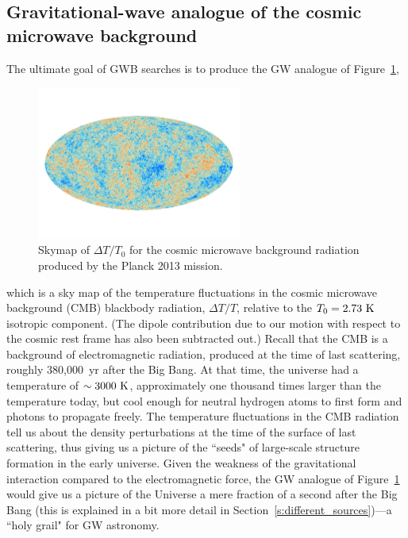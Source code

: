 \documentclass[11pt]{article}
\numberwithin{equation}{section}
\begin{document}
\subsection{Gravitational-wave analogue of the cosmic
microwave background}
\label{s:GW_CMB}

The ultimate goal of GWB searches is to produce 
the GW analogue of Figure~\ref{f:CMB},
%
\begin{figure}[htbp!]
\begin{center}
\includegraphics[width=0.6\textwidth]{Figures/CMB}
\caption{Skymap of $\Delta T/T_0$ for the cosmic microwave background
radiation produced by the Planck 2013 mission.}
\label{f:CMB}
\end{center}
\end{figure}
%
which is a sky map of the temperature fluctuations in 
the cosmic microwave background (CMB) 
blackbody radiation, $\Delta T/T$, relative 
to the $T_0 = 2.73~{\rm K}$ isotropic component.
(The dipole contribution due to our motion with respect 
to the cosmic rest frame has also been subtracted out.)
Recall that the CMB is a background of electromagnetic
radiation, produced at the time of last scattering,
roughly 380,000~yr after the Big Bang.
At that time, the universe had a temperature of 
$\sim 3000~{\rm K}$, approximately one thousand times 
larger than the temperature today, but cool enough for 
neutral hydrogen atoms to first form and photons to 
propagate freely.
The temperature fluctuations in the CMB radiation tell
us about the density perturbations at the time of 
the surface of last 
scattering, thus giving us a picture of the ``seeds" of 
large-scale structure formation in the early universe.
Given the weakness of the gravitational interaction 
compared to the electromagnetic force, the GW analogue 
of Figure~\ref{f:CMB} would give us a picture of the 
Universe a mere fraction of a second after the Big
Bang (this is explained in a bit more detail in 
Section~\ref{s:different_sources})---a ``holy grail" 
for GW astronomy.
\end{document}
